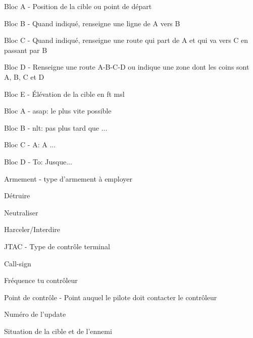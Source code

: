 \begin{e2}[0em]
	\begin{e3}[0em]
		\item Bloc A - Position de la cible ou point de départ
		\item Bloc B - Quand indiqué, renseigne une ligne de A vers B
		\item Bloc C - Quand indiqué, renseigne une route qui part de A et qui va vers C en passant par B
		\item Bloc D - Renseigne une route A-B-C-D ou indique une zone dont les coins sont A, B, C et D
		\item Bloc E - Élévation de la cible en \gls{ft} \gls{msl}
	\end{e3}
	\begin{e3}[0em]
		\item Bloc A - \acrshort{asap}: le plus vite possible
		\item Bloc B - \acrshort{nlt}: pas plus tard que ...
		\item Bloc C - A: A ...
		\item Bloc D - To: Jusque...
	\end{e3}
	\begin{e3}[0em]
		\item Armement - type d'armement à employer
		\item Détruire
		\item Neutraliser
		\item Harceler/Interdire
	\end{e3}
	\begin{e3}[0em]
		\item JTAC - Type de contrôle terminal
		\item Call-sign
		\item Fréquence tu contrôleur
		\item Point de contrôle - Point auquel le pilote doit contacter le contrôleur
	\end{e3}
	\begin{e3}[0em]
		\item Numéro de l'update
		\item Situation de la cible et de l'ennemi

\end{e3}
\end{e2}
